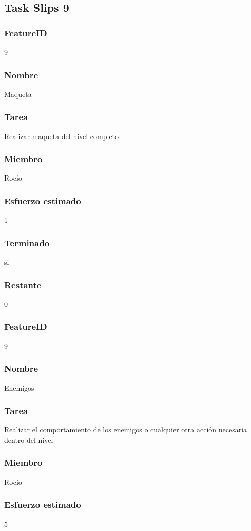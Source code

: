 \subsection{Task Slips 9}


\subsubsection{FeatureID}9
\subsubsection{Nombre}Maqueta
\subsubsection{Tarea}Realizar maqueta del nivel completo
\subsubsection{Miembro}Rocío
\subsubsection{Esfuerzo estimado}1
\subsubsection{Terminado}si
\subsubsection{Restante}0


\subsubsection{FeatureID} 9
\subsubsection{Nombre} Enemigos
\subsubsection{Tarea} Realizar el comportamiento de los enemigos o cualquier otra acción necesaria dentro del nivel
\subsubsection{Miembro} Rocio
\subsubsection{Esfuerzo estimado} 5
